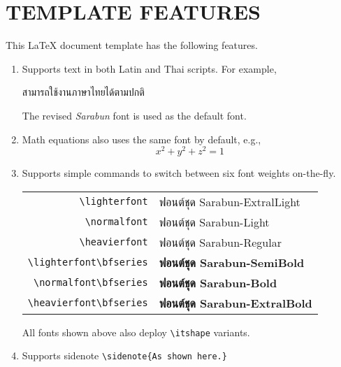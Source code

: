 
\section{TEMPLATE FEATURES}

This \LaTeX{} document template has the following features.

\begin{enumerate}

\item Supports text in both Latin and Thai scripts. For example,
    \begin{center}
        สามารถใช้งานภาษาไทยได้ตามปกติ
    \end{center}
    The revised \textit{Sarabun}
    font is used as the default font.

\item Math equations also uses the same font by default, e.g.,
    \begin{equation}
        x^2 + y^2 + z^2 = 1 \tag{3D Sphere}
    \end{equation}

\item Supports simple commands to switch between six font weights on-the-fly.
    \begin{center}
        \begin{tabular}{rl}
            \verb"\lighterfont" & {\lighterfont ฟอนต์ชุด Sarabun-ExtralLight} \\
            \verb"\normalfont"  & {\normalfont ฟอนต์ชุด Sarabun-Light}     \\
            \verb"\heavierfont" & {\heavierfont ฟอนต์ชุด Sarabun-Regular} \\
            \verb"\lighterfont\bfseries" & {\lighterfont\bfseries ฟอนต์ชุด Sarabun-SemiBold} \\
            \verb"\normalfont\bfseries"  & {\normalfont\bfseries ฟอนต์ชุด Sarabun-Bold}     \\
            \verb"\heavierfont\bfseries" & {\heavierfont\bfseries ฟอนต์ชุด Sarabun-ExtralBold} \\
        \end{tabular}
    \end{center}
    All fonts shown above also deploy \verb"\itshape" variants.

\item Supports sidenote \verb"\sidenote{As shown here.}"


\end{enumerate}
